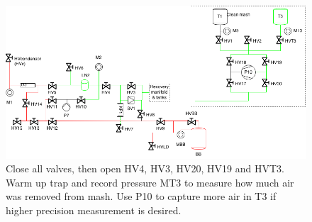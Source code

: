 \documentclass[a4paper,10pt]{article}
\begin{document}
\begin{figure}[htbp!]
 \centering
 \includegraphics[width=\textwidth]{./mash-cleaning-07.png}
 \caption{Close all valves, then open HV4, HV3, HV20, HV19 and HVT3.  Warm up trap and record pressure MT3 to measure how much air was removed from mash.  Use P10 to capture more air in T3 if higher precision measurement is desired.}
 \label{g}
\end{figure}
\end{document}
